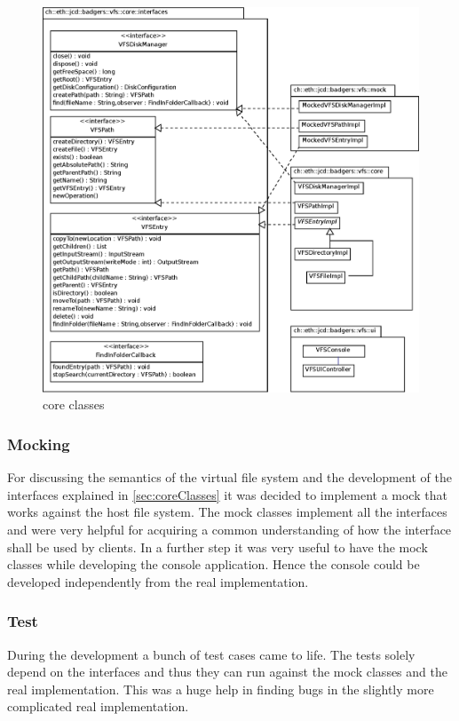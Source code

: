 \begin{figure}[h!]
\centering
\includegraphics[width=1\textwidth]{figures/core_classes.eps}
\caption{core classes}
\label{fig:core_classes}
\end{figure}

\subsubsection{Mocking}
For discussing the semantics of the virtual file system and the development of 
the interfaces explained in \ref{sec:coreClasses} it was decided to implement a mock
that works against the host file system. The mock classes implement all
the interfaces and were very helpful for acquiring a common understanding of how
the interface shall be used by clients. In a further step it was very useful to have
the mock classes while developing the console application. Hence the console
could be developed independently from the real implementation.
\subsubsection{Test}
During the development a bunch of test cases came to life. The tests solely
depend on the interfaces and thus they can run against the mock classes and the
real implementation. This was a huge help in finding bugs in the slightly more
complicated real implementation.